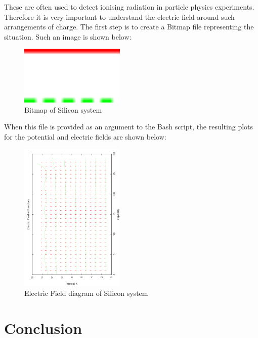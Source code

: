 \documentclass{article}
\begin{document}
These are often used to detect ionising radiation in particle physics experiments. Therefore it is very important to understand the electric field around such arrangements of charge. The first step is to create a Bitmap file representing the situation. Such an image is shown below:

\begin{figure}[H]
\centering
\includegraphics[width=50mm]{silbitmap.pdf}
\caption{Bitmap of Silicon system}
\label{fig:bitmapsilicon}
\end{figure}

When this file is provided as an argument to the Bash script, the resulting plots for the potential and electric fields are shown below:

\begin{figure}[H]
\centering
\includegraphics[width=50mm,angle=270]{siliconelec.pdf}
\caption{Electric Field diagram of Silicon system}
\label{fig:siliconelec}
\end{figure}









\section{Conclusion}
\end{document}
